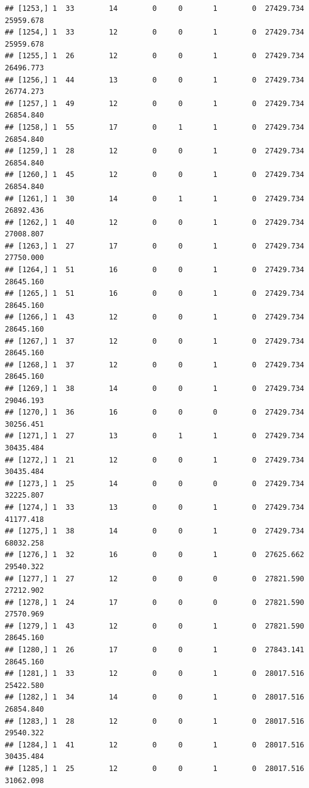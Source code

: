 \documentclass[
]{article}
\begin{document}
\begin{verbatim}
## [1253,] 1  33        14        0     0       1        0  27429.734  25959.678
## [1254,] 1  33        12        0     0       1        0  27429.734  25959.678
## [1255,] 1  26        12        0     0       1        0  27429.734  26496.773
## [1256,] 1  44        13        0     0       1        0  27429.734  26774.273
## [1257,] 1  49        12        0     0       1        0  27429.734  26854.840
## [1258,] 1  55        17        0     1       1        0  27429.734  26854.840
## [1259,] 1  28        12        0     0       1        0  27429.734  26854.840
## [1260,] 1  45        12        0     0       1        0  27429.734  26854.840
## [1261,] 1  30        14        0     1       1        0  27429.734  26892.436
## [1262,] 1  40        12        0     0       1        0  27429.734  27008.807
## [1263,] 1  27        17        0     0       1        0  27429.734  27750.000
## [1264,] 1  51        16        0     0       1        0  27429.734  28645.160
## [1265,] 1  51        16        0     0       1        0  27429.734  28645.160
## [1266,] 1  43        12        0     0       1        0  27429.734  28645.160
## [1267,] 1  37        12        0     0       1        0  27429.734  28645.160
## [1268,] 1  37        12        0     0       1        0  27429.734  28645.160
## [1269,] 1  38        14        0     0       1        0  27429.734  29046.193
## [1270,] 1  36        16        0     0       0        0  27429.734  30256.451
## [1271,] 1  27        13        0     1       1        0  27429.734  30435.484
## [1272,] 1  21        12        0     0       1        0  27429.734  30435.484
## [1273,] 1  25        14        0     0       0        0  27429.734  32225.807
## [1274,] 1  33        13        0     0       1        0  27429.734  41177.418
## [1275,] 1  38        14        0     0       1        0  27429.734  68032.258
## [1276,] 1  32        16        0     0       1        0  27625.662  29540.322
## [1277,] 1  27        12        0     0       0        0  27821.590  27212.902
## [1278,] 1  24        17        0     0       0        0  27821.590  27570.969
## [1279,] 1  43        12        0     0       1        0  27821.590  28645.160
## [1280,] 1  26        17        0     0       1        0  27843.141  28645.160
## [1281,] 1  33        12        0     0       1        0  28017.516  25422.580
## [1282,] 1  34        14        0     0       1        0  28017.516  26854.840
## [1283,] 1  28        12        0     0       1        0  28017.516  29540.322
## [1284,] 1  41        12        0     0       1        0  28017.516  30435.484
## [1285,] 1  25        12        0     0       1        0  28017.516  31062.098

\end{verbatim}
\end{document}
